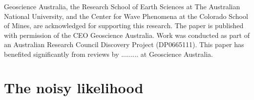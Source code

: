 \documentclass[extra, onecolumn, doublespacing]{gji}
\begin{document}
\begin{acknowledgments}
Geoscience Australia, the Research School of Earth Sciences at The
Australian National University, and the Center for Wave Phenomena at
the Colorado School of Mines, are acknowledged for supporting this
research. The paper is published with permission of the CEO
Geoscience Australia. Work was conducted as part of an Australian
Research Council Discovery Project (DP0665111).  This paper has
benefited significantly from reviews by ......... at Geoscience
Australia.
\end{acknowledgments}







\appendix

\section{The noisy likelihood}
\label{sec-Appendix-noisylikelihood}
\end{document}
